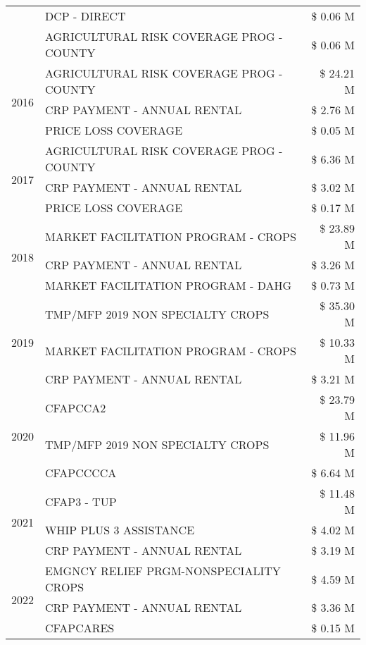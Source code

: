 \begin{tabular}{llr}
 & DCP - DIRECT & \$ 0.06 M \\
 & AGRICULTURAL RISK COVERAGE PROG - COUNTY & \$ 0.06 M \\
\cline{1-3}
\multirow[t]{3}{*}{2016} & AGRICULTURAL RISK COVERAGE PROG - COUNTY & \$ 24.21 M \\
 & CRP PAYMENT - ANNUAL RENTAL & \$ 2.76 M \\
 & PRICE LOSS COVERAGE & \$ 0.05 M \\
\cline{1-3}
\multirow[t]{3}{*}{2017} & AGRICULTURAL RISK COVERAGE PROG - COUNTY & \$ 6.36 M \\
 & CRP PAYMENT - ANNUAL RENTAL & \$ 3.02 M \\
 & PRICE LOSS COVERAGE & \$ 0.17 M \\
\cline{1-3}
\multirow[t]{3}{*}{2018} & MARKET FACILITATION PROGRAM - CROPS & \$ 23.89 M \\
 & CRP PAYMENT - ANNUAL RENTAL & \$ 3.26 M \\
 & MARKET FACILITATION PROGRAM - DAHG & \$ 0.73 M \\
\cline{1-3}
\multirow[t]{3}{*}{2019} & TMP/MFP 2019 NON SPECIALTY CROPS & \$ 35.30 M \\
 & MARKET FACILITATION PROGRAM - CROPS & \$ 10.33 M \\
 & CRP PAYMENT - ANNUAL RENTAL & \$ 3.21 M \\
\cline{1-3}
\multirow[t]{3}{*}{2020} & CFAPCCA2 & \$ 23.79 M \\
 & TMP/MFP 2019 NON SPECIALTY CROPS & \$ 11.96 M \\
 & CFAPCCCCA & \$ 6.64 M \\
\cline{1-3}
\multirow[t]{3}{*}{2021} & CFAP3 - TUP & \$ 11.48 M \\
 & WHIP PLUS 3 ASSISTANCE & \$ 4.02 M \\
 & CRP PAYMENT - ANNUAL RENTAL & \$ 3.19 M \\
\cline{1-3}
\multirow[t]{3}{*}{2022} & EMGNCY RELIEF PRGM-NONSPECIALITY CROPS & \$ 4.59 M \\
 & CRP PAYMENT - ANNUAL RENTAL & \$ 3.36 M \\
 & CFAPCARES & \$ 0.15 M \\
\cline{1-3}
\bottomrule
\end{tabular}
